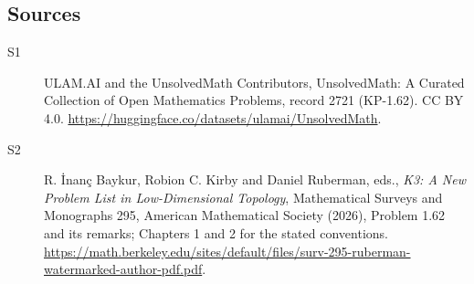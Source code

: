 \documentclass[11pt]{article}
\begin{document}
\subsection{Sources}
\begin{description}
\item[\hypertarget{source:2721:1}{S1}] ULAM.AI and the UnsolvedMath Contributors, UnsolvedMath: A Curated Collection of Open Mathematics Problems, record 2721 (KP-1.62). CC BY 4.0. \url{https://huggingface.co/datasets/ulamai/UnsolvedMath}.
\item[\hypertarget{source:2721:2}{S2}] R. İnanç Baykur, Robion C. Kirby and Daniel Ruberman, eds., \emph{K3: A New Problem List in Low-Dimensional Topology}, Mathematical Surveys and Monographs 295, American Mathematical Society (2026), Problem 1.62 and its remarks; Chapters 1 and 2 for the stated conventions. \url{https://math.berkeley.edu/sites/default/files/surv-295-ruberman-watermarked-author-pdf.pdf}.
\end{description}
\label{end:2721}
\end{document}
